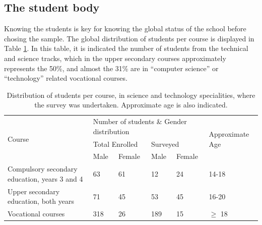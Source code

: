 \documentclass[journal,transmag]{IEEEtran}
\begin{document}
\subsection{The student body}

Knowing the students is key for knowing the global status of the school before chosing the sample. The global distribution of students per course is displayed in Table \ref{tab:muestra}. In this table, it is indicated the number of students from the technical and science tracks, which in the upper secondary courses approximately represents the 50\%, and almost the 31\% are in ``computer science'' or ``technology'' related vocational courses.

\begin{table}
  \caption[Students who undertook the surveys]{Distribution of students per course, in science and technology specialities, where the survey was undertaken. Approximate age is also indicated.}
  \label{tab:muestra}

  \begin{center}
    \begin{tabular}{|l|l|l|l|l|l|}
    \hline
    \multirow{3}{*}{Course}                       & \multicolumn{4}{l|}{Number of students \& Gender distribution}      & \multirow{3}{*}{Approximate Age} \\ \cline{2-5}
                                                  & \multicolumn{2}{l|}{Total Enrolled} & \multicolumn{2}{l|}{Surveyed} &                                  \\ \cline{2-5}
                                                  & Male             & Female           & Male         & Female         &                                  \\ \hline
    Compulsory secondary education, years 3 and 4 & 63               & 61               & 12           & 24             & 14-18                            \\ \hline
    Upper secondary education, both years         & 71               & 45               & 53           & 45             & 16-20                            \\ \hline
    Vocational courses                            & 318              & 26               & 189          & 15             & $\geq$ 18                        \\ \hline
    \end{tabular}
  \end{center}
\end{table}
\end{document}

